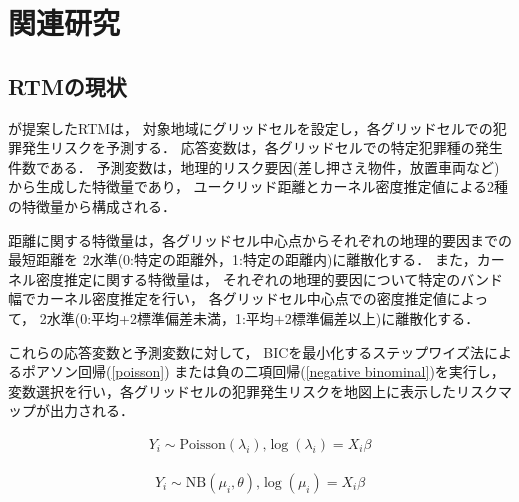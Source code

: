\documentclass[12pt,a4paper,oneside]{jsbook}
\theoremstyle{plain}
\begin{document}
\chapter{関連研究}
\label{chapter_2}
\section{RTMの現状}
\citet{caplan2015risk}が提案したRTMは，
対象地域にグリッドセルを設定し，各グリッドセルでの犯罪発生リスクを予測する．
応答変数は，各グリッドセルでの特定犯罪種の発生件数である．
予測変数は，地理的リスク要因(差し押さえ物件，放置車両など)から生成した特徴量であり，
ユークリッド距離とカーネル密度推定値による2種の特徴量から構成される．

距離に関する特徴量は，各グリッドセル中心点からそれぞれの地理的要因までの最短距離を
2水準(0:特定の距離外，1:特定の距離内)に離散化する．
また，カーネル密度推定に関する特徴量は，
それぞれの地理的要因について特定のバンド幅でカーネル密度推定を行い，
各グリッドセル中心点での密度推定値によって，
2水準(0:平均+2標準偏差未満，1:平均+2標準偏差以上)に離散化する．


これらの応答変数と予測変数に対して，
BICを最小化するステップワイズ法によるポアソン回帰\citep{68aee965-a8a0-3e72-9f89-8d89ae91a62b}(\ref{poisson})
または負の二項回帰\citep{Hilbe_2011}(\ref{negative binominal})を実行し，
変数選択を行い，各グリッドセルの犯罪発生リスクを地図上に表示したリスクマップが出力される．

\begin{align}\label{poisson}
  Y_i \sim \text{Poisson}(\lambda_i) \text{,}
  \log(\lambda_i) = X_i \beta 
\end{align}


\begin{align}\label{negative binominal}
  Y_i \sim \text{NB}(\mu_i, \theta) \text{,}
  \log(\mu_i) = X_i \beta 
\end{align}
\end{document}
